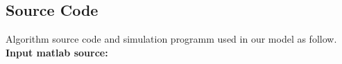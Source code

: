 \begin{appendices}
\section{Source Code}


Algorithm source code and simulation programm used in our model as follow.\\


\textbf{\textcolor[rgb]{0.98,0.00,0.00}{Input matlab source:}}
\lstset{breaklines}%

\lstset{extendedchars=false}%

%
%




%



\end{appendices}
